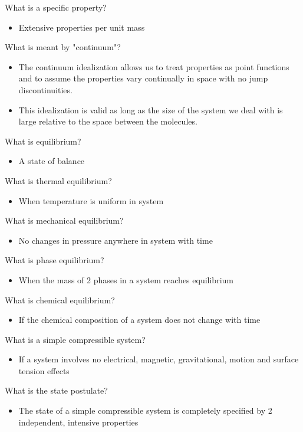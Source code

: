 \documentclass[class=report, crop=false, 12pt,a4paper]{standalone}
\begin{document}
What is a specific property?
\begin{itemize}
  \item Extensive properties per unit mass
\end{itemize}

What is meant by "continuum"?
\begin{itemize}
  \item The continuum idealization allows us to treat properties as point functions and to assume the properties vary continually in space with no jump discontinuities.
  \item This idealization is valid as long as the size of the system we deal with is large relative to the space between the molecules.
\end{itemize}

What is equilibrium?
\begin{itemize}
  \item A state of balance
\end{itemize}

What is thermal equilibrium?
\begin{itemize}
  \item When temperature is uniform in system
\end{itemize}

What is mechanical equilibrium?
\begin{itemize}
  \item No changes in pressure anywhere in system with time
\end{itemize}

What is phase equilibrium?
\begin{itemize}
  \item When the mass of 2 phases in a system reaches equilibrium
\end{itemize}

What is chemical equilibrium?
\begin{itemize}
  \item If the chemical composition of a system does not change with time
\end{itemize}

What is a simple compressible system?
\begin{itemize}
  \item If a system involves no electrical, magnetic, gravitational, motion and surface tension effects
\end{itemize}

What is the state postulate?
\begin{itemize}
  \item The state of a simple compressible system is completely specified by 2 independent, intensive properties
\end{itemize}
\end{document}

